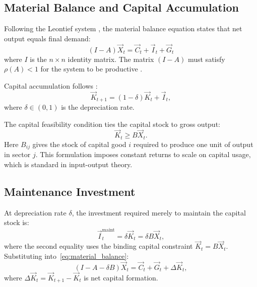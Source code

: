 \subsection{Material Balance and Capital Accumulation}

Following the Leontief system \citep{leontief1986input}, the material
balance equation states that net output equals final demand:
%
\begin{equation}\label{eq:material_balance}
    (I - A)\vec{X}_t = \vec{C}_t + \vec{I}_t + \vec{G}_{t}
\end{equation}
%
where $I$ is the $n \times n$ identity matrix.
The matrix $(I - A)$ must satisfy $\rho(A) < 1$ for the system to be
productive \citep{nikaido1970introduction}.

Capital accumulation follows \citet{von1945model}:
%
\begin{equation}\label{eq:capital_accumulation}
    \vec{K}_{t+1} = (1 - \delta)\vec{K}_t + \vec{I}_t,
\end{equation}
%
where $\delta \in (0,1)$ is the depreciation rate.

The capital feasibility condition ties the capital stock to gross
output:
%
\begin{equation}\label{eq:capital_constraint}
    \vec{K}_{t} \geq B\vec{X}_{t}.
\end{equation}
%
Here $B_{ij}$ gives the stock of capital good $i$ required to produce
one unit of output in sector $j$.
This formulation imposes constant returns to scale on capital usage,
which is standard in input-output theory.

\subsection{Maintenance Investment}

At depreciation rate $\delta$, the investment required merely to
maintain the capital stock is:
%
\begin{equation}\label{eq:maintenance}
    \vec{I}^{\mathrm{maint}}_t = \delta \vec{K}_t = \delta B \vec{X}_t,
\end{equation}
%
where the second equality uses the binding capital constraint
$\vec{K}_t = B\vec{X}_t$.
Substituting into~\eqref{eq:material_balance}:
%
\begin{equation}\label{eq:modified_balance}
    (I - A - \delta B)\vec{X}_t = \vec{C}_t +\vec{G}_{t}+ \Delta \vec{K}_t,
\end{equation}
%
where $\Delta \vec{K}_t = \vec{K}_{t+1} - \vec{K}_t$ is net capital
formation.

